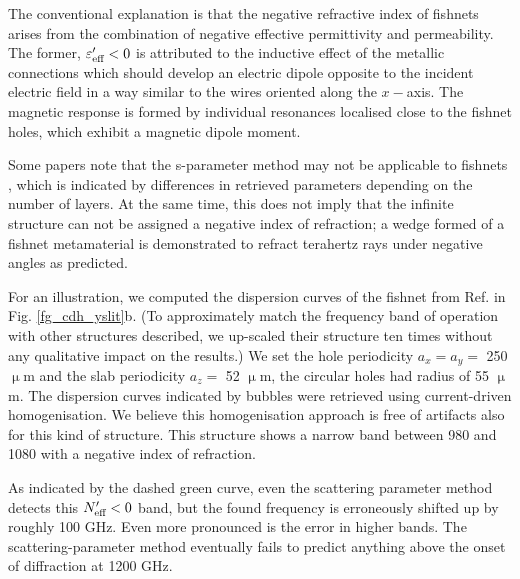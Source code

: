 
The conventional explanation is that the negative refractive index of fishnets arises from the combination of negative effective permittivity and permeability. The former, $\varepsilon_{\text{eff} }'<0$ is attributed to the inductive effect of the metallic connections which should develop an electric dipole opposite to the incident electric field in a way similar to the wires oriented along the $x-$axis. The magnetic response is formed by individual resonances localised close to the fishnet holes, which exhibit a magnetic dipole moment.

Some papers note that the s-parameter method may not be applicable to fishnets \cite{croenne2009left}\cite[p. 102]{croenne2009controle}, which is indicated by differences in retrieved parameters depending on the number of layers. At the same time, this does not imply that the infinite structure can not be assigned a negative index of refraction; a wedge formed  of a fishnet metamaterial is demonstrated to refract terahertz rays under negative angles \cite{wang2010composite} as predicted. 

For an illustration, we computed the dispersion curves of the fishnet from Ref. \cite{navarro2011dual} in Fig. \ref{fg_cdh_yslit}b. (To approximately match the frequency band of operation with other structures described, we up-scaled their structure ten times without any qualitative impact on the results.) We set the hole periodicity $a_x=a_y =$ 250 $\upmu$m and the slab periodicity $a_z =$ 52 $\upmu$m, the circular holes had radius of 55 $\upmu$m. The dispersion curves indicated by bubbles were retrieved using current-driven homogenisation. We believe this homogenisation approach is free of artifacts also for this kind of structure. This structure shows a narrow band between 980 and 1080 with a negative index of refraction. 

As indicated by the dashed green curve, even the scattering parameter method detects this $N_{\text{eff} }'<0$ band, but the found frequency is erroneously shifted up by roughly 100 GHz. Even more pronounced is the error in higher bands. The scattering-parameter method eventually fails to predict anything above the onset of diffraction at 1200 GHz.


